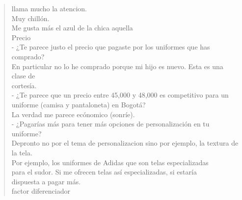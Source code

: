 \documentclass[11pt]{article}
\begin{document}
\begin{verse}
\hspace*{2em}llama mucho la atencion.\\
\hspace*{2em}Muy chillón.\\
\vspace*{1em}
\hspace*{2em}Me gusta más el azul de la chica aquella\\
\vspace*{1em}
Precio\\
\vspace*{1em}
- ¿Te parece justo el precio que pagaste por los uniformes que has comprado?\\
\vspace*{1em}
\hspace*{2em}En particular no lo he comprado porque mi hijo es nuevo. Esta es una clase de\\
\hspace*{2em}cortesía.\\
\vspace*{1em}
- ¿Te parece que un precio entre  45,000 y 48,000  es competitivo para un uniforme (camisa y pantaloneta) en Bogotá?\\
\vspace*{1em}
\hspace*{3em}La verdad me parece ecónomico (sonríe).\\
\vspace*{1em}
- ¿Pagarías más para tener más opciones de personalización en tu uniforme?\\
\vspace*{1em}
\hspace*{2em}Depronto no por el tema de personalizacion sino por ejemplo, la textura de la tela.\\
\vspace*{1em}
\hspace*{3em}Por ejemplo, los uniformes de Adidas que son telas especializadas\\
\hspace*{3em}para el sudor. Si me ofrecen telas así especializadas, si estaría\\
\hspace*{3em}dispuesta a pagar más.\\
\vspace*{1em}
\vspace*{1em}
\vspace*{1em}
\vspace*{1em}
factor diferenciador\\

\end{verse}
\end{document}
